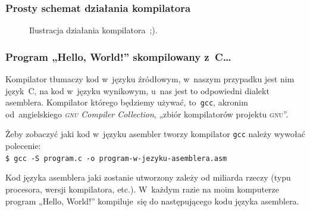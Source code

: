 \documentclass[10pt,t]{beamer}
\begin{document}
\begin{frame}
  \frametitle{Prosty schemat działania kompilatora}


  \begin{figure}


    \caption{Ilustracja działania kompilatora~;).}


  \end{figure}

\end{frame}





\begin{frame}
  \frametitle{Program „Hello, World!” skompilowany z~C\ldots}


  Kompilator tłumaczy kod w~języku źródłowym, w~naszym przypadku jest nim
  język~C, na kod w~języku wynikowym, u~nas jest to odpowiedni dialekt
  asemblera. Kompilator którego będziemy używać, to~\texttt{gcc}, akronim
  od~angielskiego \textit{\textsc{gnu} Compiler Collection}, „zbiór
  kompilatorów projektu \textsc{gnu}”.

  Żeby zobaczyć jaki kod w~języku asembler tworzy kompilator \texttt{gcc}
  należy wywołać polecenie: \\
  \texttt{\$ gcc -S program.c -o program-w-jezyku-asemblera.asm}

  Kod języka asemblera jaki zostanie utworzony zależy od miliarda rzeczy
  (typu procesora, wersji kompilatora, etc.). W~każdym razie na moim
  komputerze program „Hello, World!” kompiluje~się do następującego kodu
  języka asemblera.

\end{frame}
\end{document}
